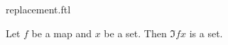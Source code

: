 \documentclass{stex}
\begin{document}
\begin{smodule}{replacement.ftl}



\begin{axiom*}[forthel,title=Replacement,name=Replacement Axiom]
  Let $f$ be a map and $x$ be a set.
  Then $\Im{f}{x}$ is a set.
\end{axiom*}

\end{smodule}
\end{document}
